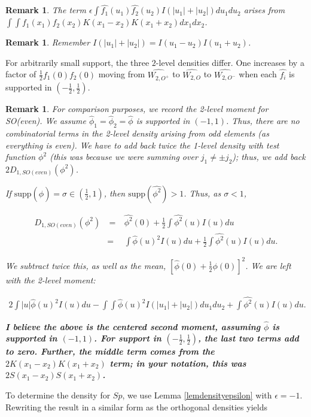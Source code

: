 \documentclass{compositio}
\newcommand\bea{\begin{eqnarray}}
\newcommand\eea{\end{eqnarray}}
\newtheorem{rek}[thm]{Remark}
\newcommand{\hphi}{\widehat{\phi}}  %
\newcommand{\foh}{\frac{1}{2}}  %
\newcommand{\hfi}{\widehat{f_i}}
\newcommand{\hfo}{\widehat{f_1}}
\newcommand{\hft}{\widehat{f_2}}
\begin{document}
\begin{rek} The term $\epsilon \int
\hfo(u_1)\hft(u_2)I(|u_1|+|u_2|)du_1du_2$ arises from $\int \int
f_1(x_1)f_2(x_2) K(x_1-x_2) K(x_1+x_2)dx_1dx_2$.
\end{rek}

\begin{rek} Remember $I(|u_1|+|u_2|) = I(u_1-u_2) I(u_1+u_2)$.
\end{rek}

For arbitrarily small support, the three $2$-level densities
differ. One increases by a factor of $\foh f_1(0) f_2(0)$ moving
from $\widehat{W_{2,O^+}}$ to $\widehat{W_{2,O}}$ to
$\widehat{W_{2,O^-}}$ when each $\hfi$ is supported in
$(-\foh,\foh)$.

\begin{rek} For comparison purposes, we record the 2-level moment
for SO(even). We assume $\hphi_1 = \hphi_2 = \hphi$ is supported
in $(-1,1)$. Thus, there are no combinatorial terms in the 2-level
density arising from odd elements (as everything is even). We have
to \emph{add back} twice the 1-level density with test function 
$\phi^2$ (this was because we were summing over $j_1 \neq \pm
j_2$); thus, we add back $2D_{1,SO(even)}(\phi^2)$.

If $\mbox{supp}(\hphi) = \sigma \in (\foh,1)$, then
$\mbox{supp}(\widehat{\phi^2}) > 1$. Thus, as $\sigma < 1$,

\bea D_{1,SO(even)}(\phi^2) & \ = \ & \widehat{\phi^2}(0) + \foh
\int \widehat{\phi^2}(u) I(u)du \nonumber\\ & = & \int \hphi(u)^2
I(u)du + \foh \int \widehat{\phi^2}(u) I(u)du. \eea

We subtract twice this, as well as the mean, $\left[ \hphi(0) +
\foh \phi(0)\right]^2$. We are left with the 2-level moment:

\bea 2 \int |u| \hphi(u)^2 I(u)du - \int\int \hphi(u)^2
I(|u_1|+|u_2|)du_1du_2 + \int \widehat{\phi^2}(u) I(u)du. \eea

\textbf{I believe the above is the centered second moment,
assuming $\hphi$ is supported in $(-1,1)$. For support in
$(-\foh,\foh)$, the last two terms add to zero. Further, the
middle term comes from the $2K(x_1-x_2) K(x_1+x_2)$ term; in your
notation, this was $2S(x_1-x_2) S(x_1+x_2)$.}

\end{rek}


To determine the density for $Sp$, we use Lemma
\ref{lemdensityepsilon} with $\epsilon = -1$. Rewriting the result
in a similar form as the orthogonal densities yields
\end{document}
